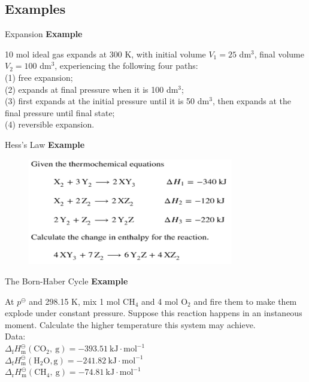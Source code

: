 \documentclass[12pt,compress]{beamer}
\begin{document}
\subsection{Examples}
\begin{frame}{Expansion}
	\textbf{Example}
	\par 10 mol ideal gas expands at 300 K, with initial volume $V_1 = 25$ dm$^3$, final volume $V_2 = 100$ dm$^3$,
	experiencing the following four paths: \\ 
	(1) free expansion; \\ 
	(2) expands at final pressure when it is 100 dm$^3$; \\ 
	(3) first expands at the initial pressure until it is 50 dm$^3$, then expands at the final pressure until final state; \\ 
	(4) reversible expansion.
\end{frame}
\begin{frame}{Hess's Law}
	\textbf{Example}
	\begin{figure}
		\centering
		\includegraphics[width=0.8\textwidth]{hess's_law.png}
	\end{figure}
\end{frame}
\begin{frame}{The Born-Haber Cycle}
	\textbf{Example}
	\par At $p^\ominus$ and 298.15 K, mix 1 mol CH$_4$ and 4 mol O$_2$ and fire them to make them explode under
	constant pressure. Suppose this  reaction happens in an instaneous moment. Calculate the higher temperature this system
	may achieve. \\ 
	Data: \\ 
	$\Delta_{\mathrm{f}} H_{\mathrm{m}}^{\ominus}\left(\mathrm{CO}_{2}, \mathrm{~g}\right)=-393.51 \mathrm{~kJ} \cdot \mathrm{mol}^{-1}$ \\ 
	$\Delta_{\mathrm{f}} H_{\mathrm{m}}^{\ominus}\left(\mathrm{H}_{2} \mathrm{O}, \mathrm{g}\right)=-241.82 \mathrm{~kJ} \cdot \mathrm{mol}^{-1}$ \\ 
	$\Delta_{\mathrm{r}} H_{\mathrm{m}}^{\ominus}\left(\mathrm{CH}_{4}, \mathrm{~g}\right)=-74.81 \mathrm{~kJ} \cdot \mathrm{mol}^{-1}$
\end{frame}
\end{document}
